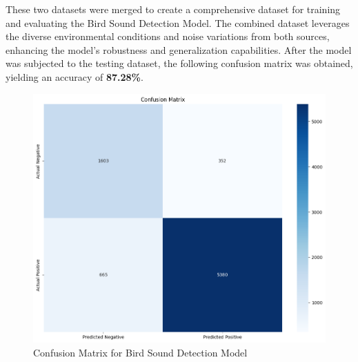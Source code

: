 These two datasets were merged to create a comprehensive dataset for training
and evaluating the Bird Sound Detection Model. The combined dataset leverages
the diverse environmental conditions and noise variations from both sources,
enhancing the model's robustness and generalization capabilities. \newpage
After the model was subjected to the testing dataset, the following confusion
matrix was obtained, yielding an accuracy of \textbf{87.28\%}.
\begin{figure}[h!]
    \centering
    \includegraphics[scale=0.35]{images/det_confusionmatrix.png}
    \caption{Confusion Matrix for Bird Sound Detection Model}
    \label{fig:Confusion Matrix for Detection Model}
\end{figure}

